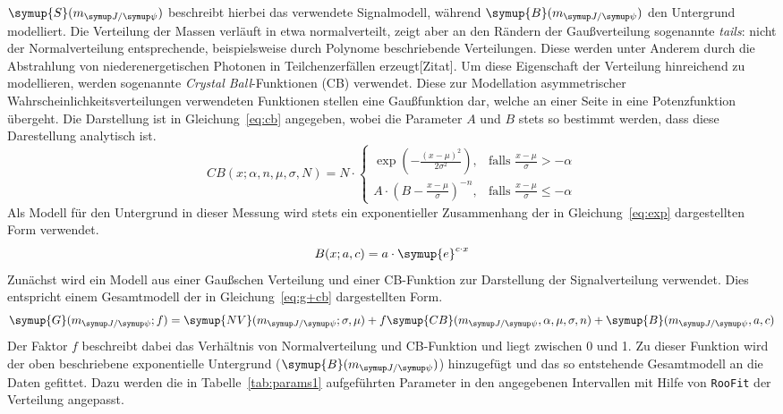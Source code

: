 %
$\symup{S}(m_{\jpsi})$ beschreibt hierbei das verwendete Signalmodell, während $\symup{B}(m_{\jpsi})$ den Untergrund modelliert. Die Verteilung der Massen verläuft in etwa normalverteilt, zeigt aber an den Rändern der Gaußverteilung sogenannte \textit{tails}: nicht der Normalverteilung entsprechende, beispielsweise durch Polynome beschriebende Verteilungen. Diese werden unter Anderem durch die Abstrahlung von niederenergetischen Photonen in Teilchenzerfällen erzeugt[Zitat]. Um diese Eigenschaft der Verteilung hinreichend zu modellieren, werden sogenannte \textit{Crystal Ball}-Funktionen (CB) verwendet. Diese zur Modellation asymmetrischer Wahrscheinlichkeitsverteilungen verwendeten Funktionen stellen eine Gaußfunktion dar, welche an einer Seite in eine Potenzfunktion übergeht. Die Darstellung ist in Gleichung~\ref{eq:cb} \cite{cb} angegeben, wobei die Parameter $A$ und $B$ stets so bestimmt werden, dass diese Darestellung analytisch ist.
%
\begin{equation}
  {\displaystyle CB(x;\alpha ,n,{\mu},\sigma,N)=N\cdot {\begin{cases}\exp \left(-{\frac {(x-{\mu})^{2}}{2\sigma ^{2}}}\right),&{\mbox{falls }}{\frac {x-{\mu}}{\sigma }}>-\alpha \\A\cdot \left(B-{\frac {x-{\mu}}{\sigma }}\right)^{-n},&{\mbox{falls }}{\frac {x-{\mu}}{\sigma }}\leqslant -\alpha \end{cases}}}
  \label{eq:cb}
\end{equation}
%
Als Modell für den Untergrund in dieser Messung wird stets ein exponentieller Zusammenhang der in Gleichung~\ref{eq:exp} dargestellten Form verwendet.
%
\begin{equation}
  B(x;a,c)=a\cdot \symup{e}^{c\cdot x}
  \label{eq:exp}
\end{equation}
%
Zunächst wird ein Modell aus einer Gaußschen Verteilung und einer CB-Funktion zur Darstellung der Signalverteilung verwendet. Dies entspricht einem Gesamtmodell der in Gleichung~\ref{eq:g+cb} dargestellten Form.
%
\begin{equation}
  \symup{G}(m_{\jpsi}; f)= \symup{NV}(m_{\jpsi};\sigma,\mu) + f\symup{CB}(m_{\jpsi},\alpha,\mu,\sigma,n) + \symup{B}(m_{\jpsi},a,c)
  \label{eq:g+cb}
\end{equation}
%
Der Faktor $f$ beschreibt dabei das Verhältnis von Normalverteilung und CB-Funktion und liegt zwischen 0 und 1. Zu dieser Funktion wird der oben beschriebene exponentielle Untergrund ($\symup{B}(m_{\jpsi})$) hinzugefügt und das so entstehende Gesamtmodell an die Daten gefittet. Dazu werden die in Tabelle~\ref{tab:params1} aufgeführten Parameter in den angegebenen Intervallen mit Hilfe von \texttt{RooFit} der Verteilung angepasst.

